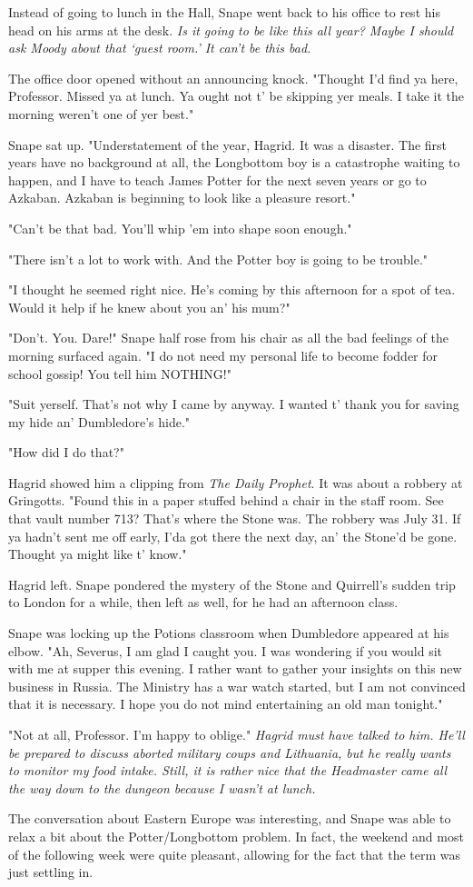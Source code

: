 Instead of going to lunch in the Hall, Snape went back to his office to rest his head on his arms at the desk. \emph{Is it going to be like this all year? Maybe I should ask Moody about that `guest room.' It can't be this bad.}

The office door opened without an announcing knock. "Thought I'd find ya here, Professor. Missed ya at lunch. Ya ought not t' be skipping yer meals. I take it the morning weren't one of yer best."

Snape sat up. "Understatement of the year, Hagrid. It was a disaster. The first years have no background at all, the Longbottom boy is a catastrophe waiting to happen, and I have to teach James Potter for the next seven years or go to Azkaban. Azkaban is beginning to look like a pleasure resort."

"Can't be that bad. You'll whip 'em into shape soon enough."

"There isn't a lot to work with. And the Potter boy is going to be trouble."

"I thought he seemed right nice. He's coming by this afternoon for a spot of tea. Would it help if he knew about you an' his mum?"

"Don't. You. Dare!" Snape half rose from his chair as all the bad feelings of the morning surfaced again. "I do not need my personal life to become fodder for school gossip! You tell him NOTHING!"

"Suit yerself. That's not why I came by anyway. I wanted t' thank you for saving my hide an' Dumbledore's hide."

"How did I do that?"

Hagrid showed him a clipping from \emph{The Daily Prophet}. It was about a robbery at Gringotts. "Found this in a paper stuffed behind a chair in the staff room. See that vault number 713? That's where the Stone was. The robbery was July 31. If ya hadn't sent me off early, I'da got there the next day, an' the Stone'd be gone. Thought ya might like t' know."

Hagrid left. Snape pondered the mystery of the Stone and Quirrell's sudden trip to London for a while, then left as well, for he had an afternoon class.

Snape was locking up the Potions classroom when Dumbledore appeared at his elbow. "Ah, Severus, I am glad I caught you. I was wondering if you would sit with me at supper this evening. I rather want to gather your insights on this new business in Russia. The Ministry has a war watch started, but I am not convinced that it is necessary. I hope you do not mind entertaining an old man tonight."

"Not at all, Professor. I'm happy to oblige." \emph{Hagrid must have talked to him. He'll be prepared to discuss aborted military coups and Lithuania, but he really wants to monitor my food intake. Still, it is rather nice that the Headmaster came all the way down to the dungeon because I wasn't at lunch.}

The conversation about Eastern Europe was interesting, and Snape was able to relax a bit about the Potter\slash Longbottom problem. In fact, the weekend and most of the following week were quite pleasant, allowing for the fact that the term was just settling in. 


